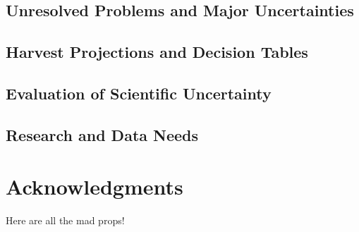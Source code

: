\documentclass[11pt,
  english,
  a4paper,
]{article}
\begin{document}
\hypertarget{unresolved-problems-and-major-uncertainties-1}{%
\subsection{Unresolved Problems and Major Uncertainties}\label{unresolved-problems-and-major-uncertainties-1}}

\leavevmode\tagmcend\tagstructend


\hypertarget{harvest-projections-and-decision-tables}{%
\subsection{Harvest Projections and Decision Tables}\label{harvest-projections-and-decision-tables}}

\leavevmode\tagmcend\tagstructend


\hypertarget{evaluation-of-scientific-uncertainty}{%
\subsection{Evaluation of Scientific Uncertainty}\label{evaluation-of-scientific-uncertainty}}

\leavevmode\tagmcend\tagstructend


\hypertarget{research-and-data-needs}{%
\subsection{Research and Data Needs}\label{research-and-data-needs}}

\leavevmode\tagmcend\tagstructend


\hypertarget{acknowledgments}{%
\section{Acknowledgments}\label{acknowledgments}}

\leavevmode\tagmcend\tagstructend


Here are all the mad props!

\leavevmode\tagmcend\tagstructend\par
\end{document}
